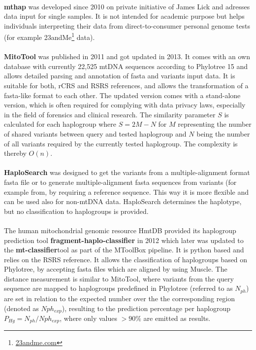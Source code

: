 \\
\textbf{mthap} was developed since 2010 on private initiative of James Lick and adresses data input for single samples. It is not intended for academic purpose but helps individuals interpreting their data from direct-to-consumer personal genome tests (for example 23andMe\footnote{\url{23andme.com}} data).\\
\\
\textbf{MitoTool} was published in 2011 and got updated in 2013. It comes with an own database with currently 22,525 mtDNA sequences according to Phylotree 15 and allows detailed parsing and annotation of fasta and variants input data. It is suitable for both, rCRS and RSRS references, and allows the transformation of a fasta-like format to each other. The updated version comes with a stand-alone version, which is often required for complying with data privacy laws, especially in the field of forensics and clinical research. The similarity parameter $S$ is calculated for each haplogroup where $S=2M-N$ for $M$ representing the number of shared variants between query and tested haplogroup and $N$ being the number of all variants required by the currently tested haplogroup. The complexity is thereby $O(n)$.\\
\\ 
\textbf{HaploSearch} was designed to get the variants from a multiple-alignment format fasta file or to generate multiple-alignment fasta sequences from variants (for example from, by requiring a reference sequence. This way it is more flexible and can be used also for non-mtDNA data. HaploSearch determines the haplotype, but no classification to haplogroups is provided.\\
\\
The human mitochondrial genomic resource HmtDB provided its haplogroup prediction tool \textbf{fragment-haplo-classifier} in 2012 which later was updated to the \textbf{mt-classifier}tool as part of the MToolBox pipeline. It is python based and relies on the RSRS reference. It allows the classification of haplogroups based on Phylotree, by accepting fasta files which are aligned by using Muscle. The distance measurement is similar to MitoTool, where variants from the query sequence are mapped to haplogroups predefined in Phylotree (referred to as $N_{ph}$) are set in relation to the expected number over the the corresponding region (denoted as $Nph_{exp}$), resulting to the prediction percentage per haplogroup $P_{Hg}=N_{ph}/Nph_{exp}$, where only values $>90\%$ are emitted as results.\\
